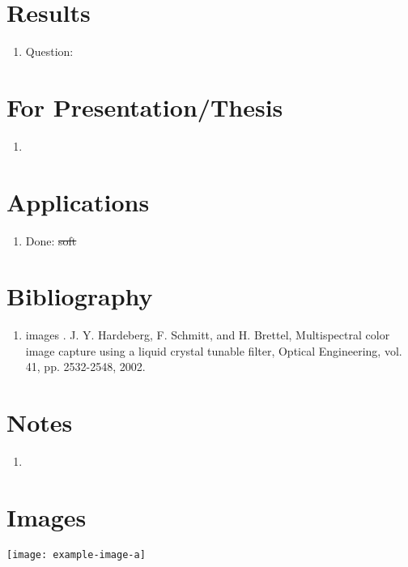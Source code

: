 \documentclass[11pt]{article}
\newcommand{\high}[1]{{\color{BrickRed}{Priority high: #1}}}
\newcommand{\ask}[1]{{\color{NavyBlue}Question:}{#1}}
\newcommand{\done}[1]{{\color{WildStrawberry}Done:} \sout{#1} }
\newcommand{\paint}[1]{{\color{TealBlue}#1}}
\begin{document}
\section{Results}
\begin{enumerate}[label=(\alph*)]
\item \ask{ \blindtext}

\end{enumerate}

\section{For Presentation/Thesis}
\begin{enumerate}[label=(\alph*)]
\item \high{dhiwisd} \blindtext
\end{enumerate}

\section{Applications}
\begin{enumerate}[label=(\alph*)]
\item \done{soft}{\color{violet}{link}}
\end{enumerate}

\section{Bibliography}
\begin{enumerate}
\item \paint{images} \blindtext [1]
. J. Y. Hardeberg, F. Schmitt, and H. Brettel, Multispectral color image capture using a liquid crystal tunable filter, Optical Engineering, vol. 41, pp. 2532-2548, 2002.
\end{enumerate}

\section{Notes}
\begin{enumerate}
\item \blindtext
\end{enumerate}

\section{Images}
\texttt{[image: example-image-a]}
\end{document}
